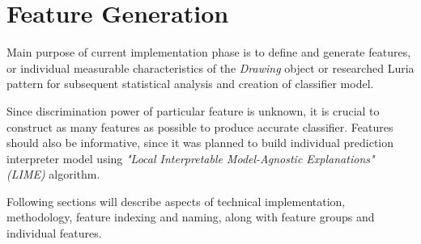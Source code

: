 \section{Feature Generation}

Main purpose of current implementation phase is to define and generate features, or individual measurable characteristics of the \textit{Drawing} object or researched Luria pattern for subsequent statistical analysis and creation of classifier model. 

Since discrimination power of particular feature is unknown, it is crucial to construct as many features as possible to produce accurate classifier. Features should also be informative, since it was planned to build individual prediction interpreter model using \textit{"Local Interpretable Model-Agnostic Explanations" (LIME)} algorithm. 

Following sections will describe aspects of technical implementation, methodology, feature indexing and naming, along with feature groups and individual features.

